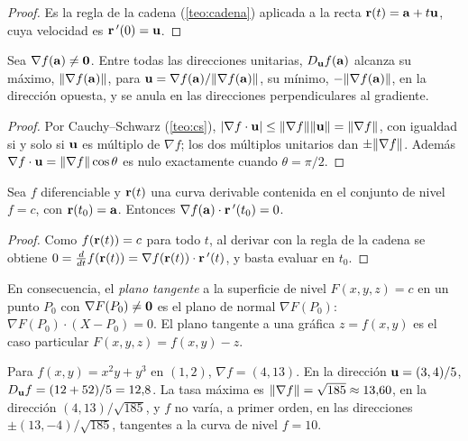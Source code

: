 \begin{proof}
Es la regla de la cadena (\cref{teo:cadena}) aplicada a la recta $\mathbf{r}(t)=\mathbf{a}+t\mathbf{u}$, cuya velocidad es $\mathbf{r}\,'(0)=\mathbf{u}$.
\end{proof}

\begin{corolario}\label{cor:maximo-crecimiento}
Sea $\nabla f(\mathbf{a})\neq\mathbf{0}$. Entre todas las direcciones unitarias, $D_{\mathbf{u}}f(\mathbf{a})$ alcanza su máximo, $\lVert\nabla f(\mathbf{a})\rVert$, para $\mathbf{u}=\nabla f(\mathbf{a})/\lVert\nabla f(\mathbf{a})\rVert$, su mínimo, $-\lVert\nabla f(\mathbf{a})\rVert$, en la dirección opuesta, y se anula en las direcciones perpendiculares al gradiente.
\end{corolario}

\begin{proof}
Por Cauchy--Schwarz (\cref{teo:cs}), $\lvert\nabla f\cdot\mathbf{u}\rvert\le\lVert\nabla f\rVert\lVert\mathbf{u}\rVert=\lVert\nabla f\rVert$, con igualdad si y solo si $\mathbf{u}$ es múltiplo de $\nabla f$; los dos múltiplos unitarios dan $\pm\lVert\nabla f\rVert$. Además $\nabla f\cdot\mathbf{u}=\lVert\nabla f\rVert\cos\theta$ es nulo exactamente cuando $\theta=\pi/2$.
\end{proof}

\begin{teorema}\label{teo:gradiente-normal}
Sea $f$ diferenciable y $\mathbf{r}(t)$ una curva derivable contenida en el conjunto de nivel $f=c$, con $\mathbf{r}(t_0)=\mathbf{a}$. Entonces $\nabla f(\mathbf{a})\cdot\mathbf{r}\,'(t_0)=0$.
\end{teorema}

\begin{proof}
Como $f(\mathbf{r}(t))=c$ para todo $t$, al derivar con la regla de la cadena se obtiene $0=\frac{d}{dt}f(\mathbf{r}(t))=\nabla f(\mathbf{r}(t))\cdot\mathbf{r}\,'(t)$, y basta evaluar en $t_0$.
\end{proof}

En consecuencia, el \emph{plano tangente} a la superficie de nivel $F(x,y,z)=c$ en un punto $P_0$ con $\nabla F(P_0)\neq\mathbf{0}$ es el plano de normal $\nabla F(P_0)$: $\nabla F(P_0)\cdot(X-P_0)=0$. El plano tangente a una gráfica $z=f(x,y)$ es el caso particular $F(x,y,z)=f(x,y)-z$.

\begin{ejemplo}\label{ej:t4-direccional}
Para $f(x,y)=x^2y+y^3$ en $(1,2)$, $\nabla f=(4,13)$. En la dirección $\mathbf{u}=(3,4)/5$, $D_{\mathbf{u}}f=(12+52)/5=12{,}8$. La tasa máxima es $\lVert\nabla f\rVert=\sqrt{185}\approx13{,}60$, en la dirección $(4,13)/\sqrt{185}$, y $f$ no varía, a primer orden, en las direcciones $\pm(13,-4)/\sqrt{185}$, tangentes a la curva de nivel $f=10$.
\end{ejemplo}

